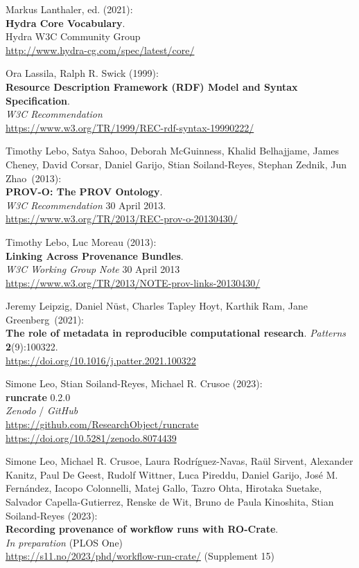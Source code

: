 \begin{thebibliography}{9}
Markus Lanthaler, ed. (2021):\\
\textbf{Hydra Core Vocabulary}.\\
Hydra W3C Community Group\\
\url{http://www.hydra-cg.com/spec/latest/core/} 

Ora Lassila, Ralph R. Swick (1999): \\
\textbf{Resource {Description Framework} ({RDF}) {Model} and {Syntax Specification}}. \\
\emph{W3C Recommendation}\\
\url{https://www.w3.org/TR/1999/REC-rdf-syntax-19990222/}  

Timothy Lebo, Satya Sahoo, Deborah McGuinness, Khalid Belhajjame, 
James Cheney, David Corsar, Daniel Garijo, Stian Soiland-Reyes, 
Stephan Zednik, Jun Zhao~(2013):\\
\textbf{PROV-O: The PROV Ontology}.\\
\emph{W3C Recommendation} 30 April 2013.\\
\url{https://www.w3.org/TR/2013/REC-prov-o-20130430/}

Timothy Lebo, Luc Moreau (2013): \\
\textbf{Linking {Across Provenance Bundles}}.\\
\emph{W3C Working Group Note} 30 April 2013 \\
\url{https://www.w3.org/TR/2013/NOTE-prov-links-20130430/}

Jeremy Leipzig, Daniel Nüst, Charles Tapley Hoyt, Karthik Ram,
Jane Greenberg~(2021):\\
\textbf{The role of metadata in reproducible computational research}.
\emph{Patterns} \textbf{2}(9):100322.\\
\url{https://doi.org/10.1016/j.patter.2021.100322}

Simone Leo, Stian Soiland-Reyes, Michael R. Crusoe (2023):\\
\textbf{runcrate} 0.2.0\\
\emph{Zenodo} / \emph{GitHub}\\
\url{https://github.com/ResearchObject/runcrate}\\
\url{https://doi.org/10.5281/zenodo.8074439}

Simone Leo, Michael R. Crusoe, Laura Rodríguez-Navas, Raül Sirvent, Alexander Kanitz, Paul De Geest, Rudolf Wittner, Luca Pireddu, Daniel Garijo, José M. Fernández, Iacopo Colonnelli, Matej Gallo, Tazro Ohta, Hirotaka Suetake, Salvador Capella-Gutierrez, Renske de Wit, Bruno de Paula Kinoshita, Stian Soiland-Reyes (2023):\\
\textbf{Recording provenance of workflow runs with RO-Crate}.\\
\emph{In preparation} (PLOS One)\\
\url{https://s11.no/2023/phd/workflow-run-crate/} 
(Supplement 15)


\end{thebibliography}
